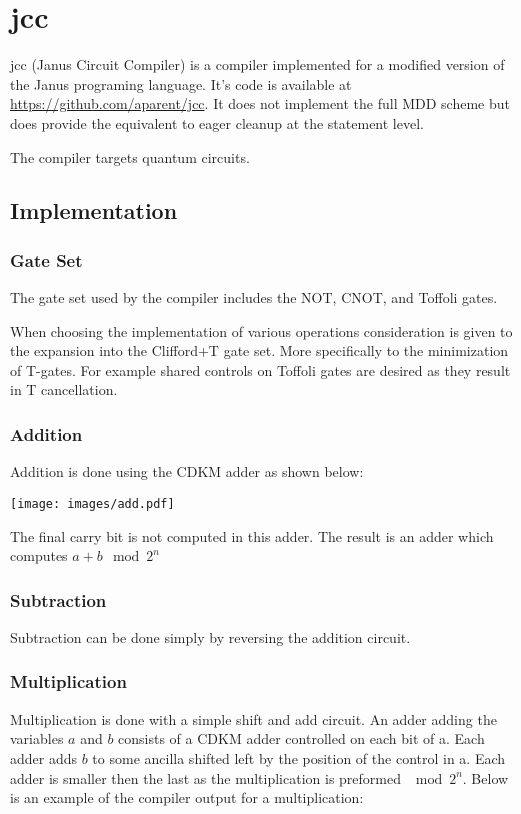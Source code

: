 \chapter{jcc}

jcc (Janus Circuit Compiler) is a compiler implemented for a modified version
of the Janus programing language\cite{YG:2007}.  It's code is available at
\url{https://github.com/aparent/jcc}.  It does not implement the full MDD
scheme but does provide the equivalent to eager cleanup at the statement level.

The compiler targets quantum circuits.

\section{Implementation}
\subsection{Gate Set}

The gate set used by the compiler includes the NOT, CNOT, and Toffoli gates.

When choosing the implementation of various operations consideration is given to the expansion into the Clifford+T gate set. More specifically to the minimization of T-gates. For example shared controls on Toffoli gates are desired as they result in T cancellation.

\subsection{Addition}
Addition is done using the CDKM\cite{CDKM:2004} adder as shown below:


\texttt{[image: images/add.pdf]}

The final carry bit is not computed in this adder.
The result is an adder which computes $a+b \mod 2^n$

\subsection{Subtraction}
Subtraction can be done simply by reversing the addition circuit.

\subsection{Multiplication}
Multiplication is done with a simple shift and add circuit.
An adder adding the variables $a$ and $b$ consists of a CDKM\cite{CDKM:2004} adder controlled on each bit of a.
Each adder adds $b$ to some ancilla shifted left by the position of the control in a.
Each adder is smaller then the last as the multiplication is preformed $\mod 2^n$.
Below is an example of the compiler output for a multiplication:

